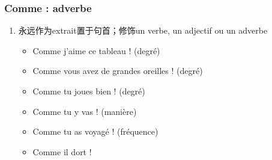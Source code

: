 \documentclass[UTF8]{report}
\begin{document}
\subsubsection{Comme : adverbe}
\begin{enumerate}
    \item 永远作为extrait置于句首；修饰un verbe, un adjectif ou un adverbe
    \begin{itemize}
        \item Comme j’aime ce tableau ! (degré)
        \item Comme vous avez de grandes oreilles ! (degré)
        \item Comme tu joues bien ! (degré)
        \item Comme tu y vas ! (manière)
        \item Comme tu as voyagé ! (fréquence)
        \item Comme il dort !
    \end{itemize}
\end{enumerate}
\end{document}
